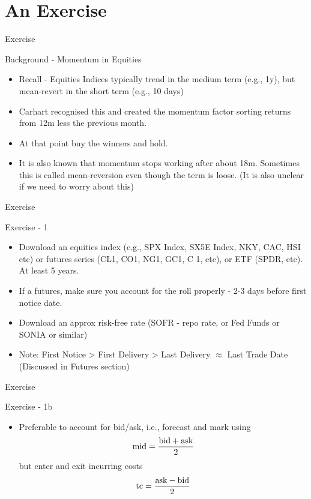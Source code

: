 \section{An Exercise}

\begin{frame}{Exercise}
\begin{alertblock}{Background - Momentum in Equities}
    \begin{itemize}
        \item Recall - Equities Indices typically trend in the medium term (e.g., 1y), but mean-revert in the short term (e.g., 10 days)
        \item Carhart recognised this and created the momentum factor sorting returns from 12m less the previous month.
        \item At that point buy the winners and hold. 
        \item It is also known that momentum stops  working after about 18m. Sometimes this is called mean-reversion even though the term is loose. (It is also unclear if we need to worry about this) 
    \end{itemize}
\end{alertblock}
\end{frame}

\begin{frame}{Exercise}
\begin{alertblock}{Exercise - 1}
    \begin{itemize}
        \item Download an equities index  (e.g., SPX Index, SX5E Index, NKY, CAC, HSI etc) or futures series (CL1, CO1, NG1, GC1, C 1, etc), or ETF (SPDR, etc). At least 5 years.
        \item If a futures, make sure you account for the roll properly - 2-3 days before first notice date.
        \item Download an approx risk-free rate (SOFR - repo rate, or Fed Funds or SONIA or similar)
        \item Note: First Notice > First Delivery > Last Delivery $\approx$ Last Trade Date (Discussed in Futures section)
    \end{itemize}
\end{alertblock}
\end{frame}
\begin{frame}{Exercise}
\begin{alertblock}{Exercise - 1b}
    \begin{itemize}
        
        \item Preferable to account for bid/ask, i.e., forecast and mark using 
        $$\hbox{mid}=\frac{\hbox{bid}+\hbox{ask}}{2}$$ 
        but enter and exit incurring costs 
        $$\hbox{tc} = \frac{\hbox{ask} - \hbox{bid}}{2}$$
    \end{itemize}
\end{alertblock}
\end{frame}

